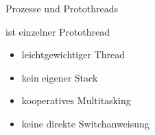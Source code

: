 \begin{frame}{Prozesse und Protothreads}
	\begin{description}[Protothread]
	\item[Prozess]
		ist einzelner Protothread
	\item[{Protothread}]
		\begin{itemize}
		\item	leichtgewichtiger Thread
		\item	\alert{kein} eigener Stack
		\item	kooperatives Multitasking
		\item	keine direkte Switchanweisung
		\end{itemize}
	\end{description}
\end{frame}
%
%	

